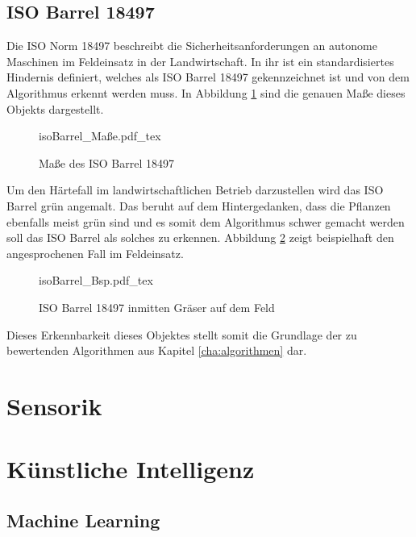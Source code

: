 \documentclass[12pt,
titlepage,
a4paper,
oneside,     %
openany,     %
listof=totoc,  %
numbers = noenddot, %
bibliography=totoc,    %
headsepline, %
]{scrbook} %
\begin{document}
\subsection{ISO Barrel 18497}
\label{subsec_iso}

Die ISO Norm 18497 beschreibt die Sicherheitsanforderungen an autonome Maschinen im Feldeinsatz in der Landwirtschaft. In ihr ist ein standardisiertes Hindernis definiert, welches als ISO Barrel 18497 gekennzeichnet ist und von dem Algorithmus erkennt werden muss. In Abbildung \ref{fig:isoBarrel} sind die genauen Maße dieses Objekts dargestellt. \\

\begin{figure}[h]
	\centering
	\def\svgwidth{0.6\columnwidth}
	{isoBarrel_Maße.pdf_tex}
	\caption{Maße des ISO Barrel 18497}
	\label{fig:isoBarrel}
\end{figure}

Um den Härtefall im landwirtschaftlichen Betrieb darzustellen wird das ISO Barrel grün angemalt. Das beruht auf dem Hintergedanken, dass die Pflanzen ebenfalls meist grün sind und es somit dem Algorithmus schwer gemacht werden soll das ISO Barrel als solches zu erkennen. Abbildung \ref{fig:isoBarrelBsp} zeigt beispielhaft den angesprochenen Fall im Feldeinsatz. \\

\begin{figure}[h]
	\centering
	\def\svgwidth{0.8\columnwidth}
	{isoBarrel_Bsp.pdf_tex}
	\caption{ISO Barrel 18497 inmitten Gräser auf dem Feld}
	\label{fig:isoBarrelBsp}
\end{figure}

Dieses Erkennbarkeit dieses Objektes stellt somit die Grundlage der zu bewertenden Algorithmen aus Kapitel \ref{cha:algorithmen} dar.

\section{Sensorik}
\label{sec_sensorik}

\section{Künstliche Intelligenz}
\label{sec_ki}

\subsection{Machine Learning}
\label{subsec_machine}
\end{document}
